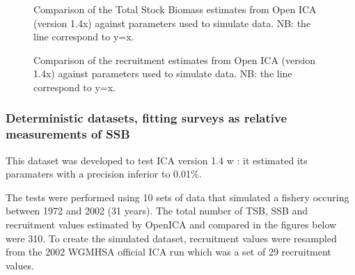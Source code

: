  \begin{figure}
  	\begin{center}
  	\end{center}
  	\caption{Comparison of the Total Stock Biomass estimates from Open ICA (version 1.4x) against parameters used to simulate data. NB: the line correspond to y=x.}
  \end{figure}

  \begin{figure}
  	\begin{center}
  	\end{center}
  	\caption{Comparison of the recruitment estimates from Open ICA (version 1.4x) against parameters used to simulate data. NB: the line correspond to y=x.}
  \end{figure}


\subsubsection{Deterministic datasets, fitting surveys as relative measurements of SSB}

This dataset was developed to test ICA version 1.4 w \citep{kieTR05}: it estimated its paramaters with a precision inferior to 0.01\%. 

The tests were performed using 10 sets of data that simulated a fishery occuring between 1972 and 2002 (31 years). The total number of TSB, SSB and recruitment values estimated by OpenICA and compared in the figures below were 310. To create the simulated dataset, recruitment values were resampled from the 2002 WGMHSA official ICA run which was a set of 29 recruitment values.

